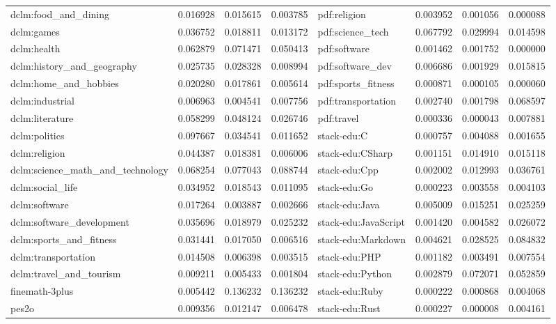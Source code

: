 \documentclass[table]{ai2style/ai2}
\begin{document}
\begin{table}[t]
\begin{tabular}{lccc | lccc}
dclm:food\_and\_dining & 0.016928 & 0.015615 & 0.003785 & pdf:religion & 0.003952 & 0.001056 & 0.000088 \\
dclm:games & 0.036752 & 0.018811 & 0.013172 & pdf:science\_tech & 0.067792 & 0.029994 & 0.014598 \\
dclm:health & 0.062879 & 0.071471 & 0.050413 & pdf:software & 0.001462 & 0.001752 & 0.000000 \\
dclm:history\_and\_geography & 0.025735 & 0.028328 & 0.008994 & pdf:software\_dev & 0.006686 & 0.001929 & 0.015815 \\
dclm:home\_and\_hobbies & 0.020280 & 0.017861 & 0.005614 & pdf:sports\_fitness & 0.000871 & 0.000105 & 0.000060 \\
dclm:industrial & 0.006963 & 0.004541 & 0.007756 & pdf:transportation & 0.002740 & 0.001798 & 0.068597 \\
dclm:literature & 0.058299 & 0.048124 & 0.026746 & pdf:travel & 0.000336 & 0.000043 & 0.007881 \\
dclm:politics & 0.097667 & 0.034541 & 0.011652 & stack-edu:C & 0.000757 & 0.004088 & 0.001655 \\
dclm:religion & 0.044387 & 0.018381 & 0.006006 & stack-edu:CSharp & 0.001151 & 0.014910 & 0.015118 \\
dclm:science\_math\_and\_technology & 0.068254 & 0.077043 & 0.088744 & stack-edu:Cpp & 0.002002 & 0.012993 & 0.036761 \\
dclm:social\_life & 0.034952 & 0.018543 & 0.011095 & stack-edu:Go & 0.000223 & 0.003558 & 0.004103 \\
dclm:software & 0.017264 & 0.003887 & 0.002666 & stack-edu:Java & 0.005009 & 0.015251 & 0.025259 \\
dclm:software\_development & 0.035696 & 0.018979 & 0.025232 & stack-edu:JavaScript & 0.001420 & 0.004582 & 0.026072 \\
dclm:sports\_and\_fitness & 0.031441 & 0.017050 & 0.006516 & stack-edu:Markdown & 0.004621 & 0.028525 & 0.084832 \\
dclm:transportation & 0.014508 & 0.006398 & 0.003515 & stack-edu:PHP & 0.001182 & 0.003491 & 0.007554 \\
dclm:travel\_and\_tourism & 0.009211 & 0.005433 & 0.001804 & stack-edu:Python & 0.002879 & 0.072071 & 0.052859 \\
finemath-3plus & 0.005442 & 0.136232 & 0.136232 & stack-edu:Ruby & 0.000222 & 0.000868 & 0.004068 \\
pes2o & 0.009356 & 0.012147 & 0.006478 & stack-edu:Rust & 0.000227 & 0.000008 & 0.004161 \\

\end{tabular}
\end{table}
\end{document}
